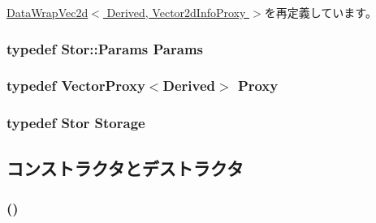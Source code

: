 \hyperlink{classStats_1_1DataWrapVec2d_a76d2c248839f34168d2a3760bc1fbdb9}{DataWrapVec2d$<$ Derived, Vector2dInfoProxy $>$}を再定義しています。\hypertarget{classStats_1_1Vector2dBase_a24c5f88dc162c95e0b32ade67a7ea674}{
\subsubsection[{Params}]{\setlength{\rightskip}{0pt plus 5cm}typedef Stor::Params {\bf Params}}}
\label{classStats_1_1Vector2dBase_a24c5f88dc162c95e0b32ade67a7ea674}
\hypertarget{classStats_1_1Vector2dBase_a7e8143c467f6c2e7fe9e1f4f051a6642}{
\subsubsection[{Proxy}]{\setlength{\rightskip}{0pt plus 5cm}typedef {\bf VectorProxy}$<$Derived$>$ {\bf Proxy}}}
\label{classStats_1_1Vector2dBase_a7e8143c467f6c2e7fe9e1f4f051a6642}
\hypertarget{classStats_1_1Vector2dBase_a5d4a6db0e7c32292f54a08d05c671bd1}{
\subsubsection[{Storage}]{\setlength{\rightskip}{0pt plus 5cm}typedef Stor {\bf Storage}}}
\label{classStats_1_1Vector2dBase_a5d4a6db0e7c32292f54a08d05c671bd1}


\subsection{コンストラクタとデストラクタ}
\hypertarget{classStats_1_1Vector2dBase_ac15f5b9d9e5fc960adc62ad5854aaac1}{
\subsubsection[{Vector2dBase}]{ ()}}
\label{classStats_1_1Vector2dBase_ac15f5b9d9e5fc960adc62ad5854aaac1}



